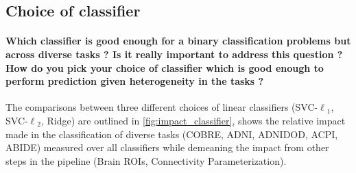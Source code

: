 \documentclass[5p]{elsarticle}
\begin{document}

 \subsection{Choice of classifier}
 \paragraph{Which classifier is good enough for a binary classification
     problems but across diverse tasks ? Is it really important to address
     this question ? How do you pick your choice of classifier which
     is good enough to perform prediction given heterogeneity in the tasks ?}

     The comparisons between three different choices of linear classifiers
     (SVC-$\ell{_1}$, SVC-$\ell{_2}$, Ridge) are outlined in
     \autoref{fig:impact_classifier}, shows the relative impact made in the
     classification of diverse tasks (COBRE, ADNI, ADNIDOD, ACPI, ABIDE) measured
     over all classifiers while demeaning the impact from other steps in the
     pipeline (Brain ROIs, Connectivity Parameterization).
\end{document}
